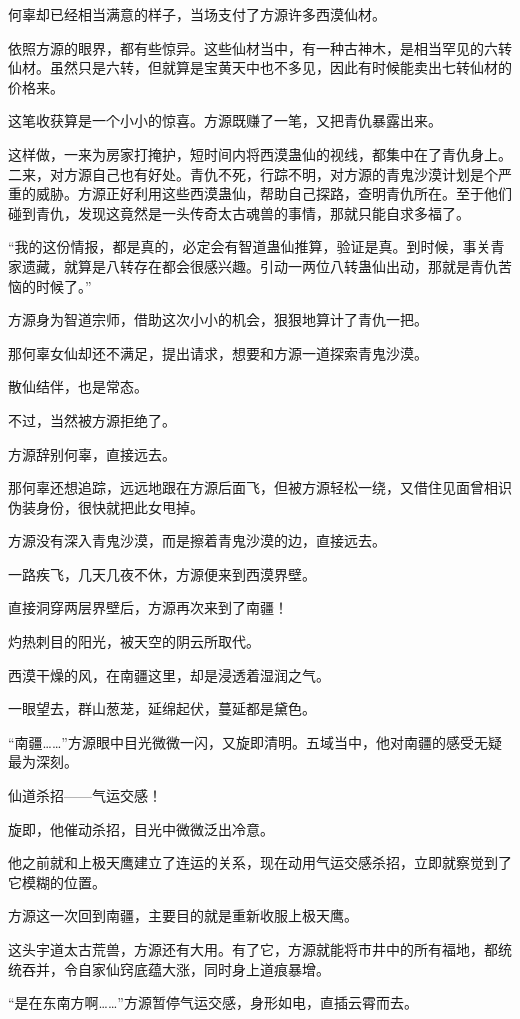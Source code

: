 \begin{this_body}
何辜却已经相当满意的样子，当场支付了方源许多西漠仙材。

依照方源的眼界，都有些惊异。这些仙材当中，有一种古神木，是相当罕见的六转仙材。虽然只是六转，但就算是宝黄天中也不多见，因此有时候能卖出七转仙材的价格来。

这笔收获算是一个小小的惊喜。方源既赚了一笔，又把青仇暴露出来。

这样做，一来为房家打掩护，短时间内将西漠蛊仙的视线，都集中在了青仇身上。二来，对方源自己也有好处。青仇不死，行踪不明，对方源的青鬼沙漠计划是个严重的威胁。方源正好利用这些西漠蛊仙，帮助自己探路，查明青仇所在。至于他们碰到青仇，发现这竟然是一头传奇太古魂兽的事情，那就只能自求多福了。

“我的这份情报，都是真的，必定会有智道蛊仙推算，验证是真。到时候，事关青家遗藏，就算是八转存在都会很感兴趣。引动一两位八转蛊仙出动，那就是青仇苦恼的时候了。”

方源身为智道宗师，借助这次小小的机会，狠狠地算计了青仇一把。

那何辜女仙却还不满足，提出请求，想要和方源一道探索青鬼沙漠。

散仙结伴，也是常态。

不过，当然被方源拒绝了。

方源辞别何辜，直接远去。

那何辜还想追踪，远远地跟在方源后面飞，但被方源轻松一绕，又借住见面曾相识伪装身份，很快就把此女甩掉。

方源没有深入青鬼沙漠，而是擦着青鬼沙漠的边，直接远去。

一路疾飞，几天几夜不休，方源便来到西漠界壁。

直接洞穿两层界壁后，方源再次来到了南疆！

灼热刺目的阳光，被天空的阴云所取代。

西漠干燥的风，在南疆这里，却是浸透着湿润之气。

一眼望去，群山葱茏，延绵起伏，蔓延都是黛色。

“南疆……”方源眼中目光微微一闪，又旋即清明。五域当中，他对南疆的感受无疑最为深刻。

仙道杀招——气运交感！

旋即，他催动杀招，目光中微微泛出冷意。

他之前就和上极天鹰建立了连运的关系，现在动用气运交感杀招，立即就察觉到了它模糊的位置。

方源这一次回到南疆，主要目的就是重新收服上极天鹰。

这头宇道太古荒兽，方源还有大用。有了它，方源就能将市井中的所有福地，都统统吞并，令自家仙窍底蕴大涨，同时身上道痕暴增。

“是在东南方啊……”方源暂停气运交感，身形如电，直插云霄而去。

\end{this_body}

